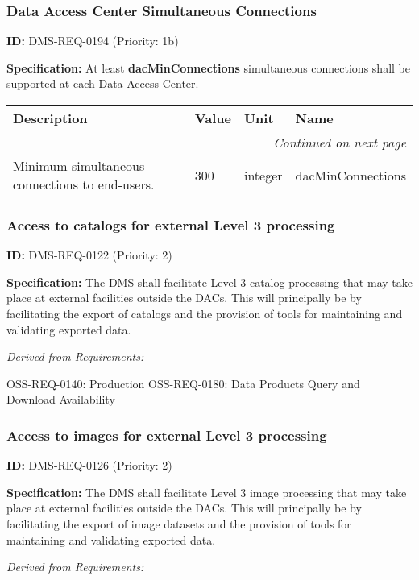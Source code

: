 \documentclass[SE,toc,lsstdraft]{lsstdoc}
\makeatletter
\newcommand{\paramname}[1]{\hspace{0pt}#1}
\newcommand{\unitname}[1]{\hspace{0pt}#1}
\newenvironment{parameters}[0]{%
\setlength\LTleft{0pt}
\setlength\LTright{\fill}
\begin{small}
\begin{longtable}[]{|p{0.49\textwidth}|l|p{0.6in}|p{1.70in}@{}|}

\hline \textbf{Description} & \textbf{Value} & \textbf{Unit} & \textbf{Name} \\ \hline
\endhead

\hline \multicolumn{4}{r}{\emph{Continued on next page}} \\
\endfoot

\hline\hline
\endlastfoot
}{%
\hline
\end{longtable}
\end{small}
}
\makeatother
\begin{document}
\subsubsection{Data Access Center Simultaneous Connections}

\label{DMS-REQ-0194}
\textbf{ID:} DMS-REQ-0194 (Priority: 1b)

\textbf{Specification:} At least \textbf{dacMinConnections }simultaneous connections shall be supported at each Data Access Center.

\begin{parameters}
Minimum simultaneous connections to end-users.
&
300
&
\unitname{%
integer
}
&
\paramname{%
dacMinConnections
} \\\hline
\end{parameters}

\subsubsection{Access to catalogs for external Level 3 processing}

\label{DMS-REQ-0122}
\textbf{ID:} DMS-REQ-0122 (Priority: 2)

\textbf{Specification: }The DMS shall facilitate Level 3 catalog processing that may take place at external facilities outside the DACs.  This will principally be by facilitating the export of catalogs and the provision of tools for maintaining and validating exported data.

\emph{Derived from Requirements:}

OSS-REQ-0140:
Production \newline
OSS-REQ-0180:
Data Products Query and Download Availability \newline

\subsubsection{Access to images for external Level 3 processing}

\label{DMS-REQ-0126}
\textbf{ID:} DMS-REQ-0126 (Priority: 2)

\textbf{Specification: }The DMS shall facilitate Level 3 image processing that may take place at external facilities outside the DACs.  This will principally be by facilitating the export of image datasets and the provision of tools for maintaining and validating exported data.

\emph{Derived from Requirements:}
\end{document}
